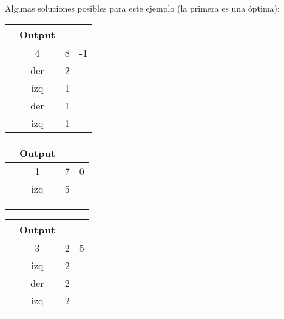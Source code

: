 \documentclass[11pt, a4paper, twoside]{article}
\begin{document}
\begin{ejemplo}
Algunas soluciones posibles para este ejemplo (la primera es una óptima): 
    \begin{center}	
      \begin{minipage}{0.3\textwidth}
          \begin{tabular}{cccc}
            & Output \\
			\hline
			& 4   & 8  & -1 \\
                 & der & 2  & \\
                 & izq & 1  & \\
                 & der & 1  & \\
                 & izq & 1  & \\
          \end{tabular}
      \end{minipage} 
      \begin{minipage}{0.3\textwidth}
          \begin{tabular}{cccc}
            & Output \\
			\hline
			& 1   & 7  & 0 \\
                 & izq & 5  & \\
                 \\
                 \\
                 \\
          \end{tabular}
      \end{minipage}	
      \begin{minipage}{0.3\textwidth}
          \begin{tabular}{cccc}
            & Output \\
			\hline
			& 3   & 2  & 5 \\
                 & izq & 2 & \\
                  & der & 2 &\\
                 & izq & 2 &\\
                 \\
          \end{tabular}
      \end{minipage}	  	  
    \end{center}

    
\end{ejemplo}
\end{document}
